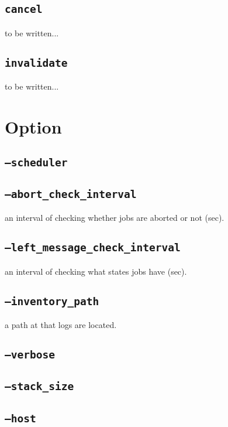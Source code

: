 \documentclass[a4paper,10pt]{report}
\begin{document}
\section{\texttt{cancel}}
to be written...
\section{\texttt{invalidate}}
to be written...

\chapter{Option}\label{chapoption}

\section{\texttt{--scheduler}}
\section{\texttt{--abort\_check\_interval}}

an interval of checking whether jobs are aborted or not (sec).

\section{\texttt{--left\_message\_check\_interval}}

an interval of checking what states jobs have (sec).

\section{\texttt{--inventory\_path}}

a path at that logs are located.

\section{\texttt{--verbose}}
\section{\texttt{--stack\_size}}

\section{\texttt{--host}}
\end{document}
